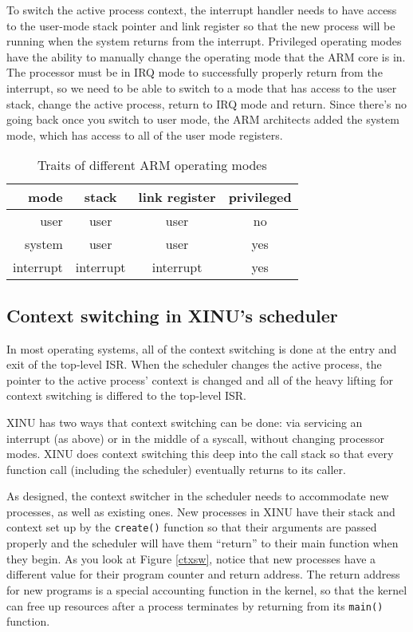 \documentclass[12pt]{article}
\newcommand{\code}[1]{{\tt #1}}
\begin{document}
To switch the active process context, the interrupt handler needs to have
access to the user-mode stack pointer and link register so that the new process
will be running when the system returns from the interrupt.  Privileged
operating modes have the ability to manually change the operating mode that the
ARM core is in. The processor must be in IRQ mode to successfully properly
return from the interrupt, so we need to be able to switch to a mode that has
access to the user stack, change the active process, return to IRQ mode and
return. Since there's no going back once you switch to user mode, the ARM
architects added the system mode, which has access to all of the user mode
registers.

\begin{table}[h]
\caption{Traits of different ARM operating modes}
\label{arm-modes}
\center
\begin{tabular}{| r || c | c | c |}
\hline
mode & stack & link register & privileged \\\hline\hline
user & user & user & no \\\hline
system & user & user & yes \\\hline
interrupt & interrupt & interrupt & yes \\\hline
\end{tabular}
\end{table}

\subsection{Context switching in XINU's scheduler}
In most operating systems, all of the context switching is done at the entry
and exit of the top-level ISR. When the scheduler changes the active process,
the pointer to the active process' context is changed and all of the heavy
lifting for context switching is differed to the top-level ISR.

XINU has two ways that context switching can be done: via servicing an
interrupt (as above) or in the middle of a syscall, without changing processor
modes. XINU does context switching this deep into the call stack so that every
function call (including the scheduler) eventually returns to its caller.

As designed, the context switcher in the scheduler needs to accommodate new
processes, as well as existing ones. New processes in XINU have their stack and
context set up by the \code{create()} function so that their arguments are
passed properly and the scheduler will have them ``return'' to their main
function when they begin. As you look at Figure \ref{ctxsw}, notice that new
processes have a different value for their program counter and return address.
The return address for new programs is a special accounting function in the
kernel, so that the kernel can free up resources after a process terminates by
returning from its \code{main()} function.
\end{document}
